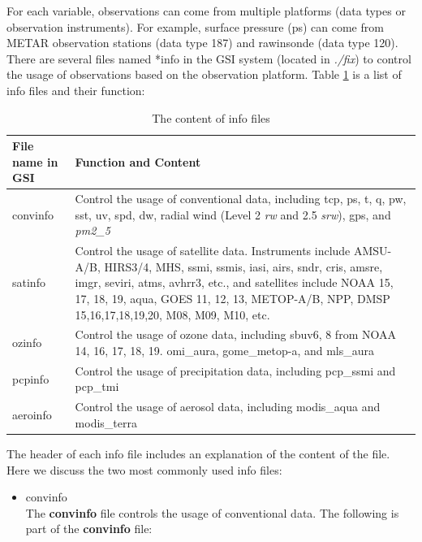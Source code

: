 \begin{enumerate}[leftmargin=*]
For each variable, observations can come from multiple platforms (data types or observation instruments). For example, surface pressure (ps) can come from METAR observation stations (data type 187) and rawinsonde (data type 120). There are several files named *info in the GSI system (located in \textit{./fix}) to control the usage of observations based on the observation platform. Table \ref{tab42} is a list of info files and their function:
\begin{table}[htbp]
\centering
\caption{The content of info files }
\begin{tabular}{|p{2cm}|p{14cm}|}
\hline
\hline
File name in GSI & Function and Content \\
\hline
convinfo & Control the usage of conventional data, including tcp, ps, t, q, pw, sst, uv, spd, dw, radial wind (Level 2 \textit{rw} and 2.5 \textit{srw}), gps, and \textit{pm2\_5} \\
\hline
satinfo	 & Control the usage of satellite data. Instruments include AMSU-A/B, HIRS3/4, MHS, ssmi, ssmis, iasi, airs, sndr, cris, amsre, imgr, seviri, atms, avhrr3, etc., and satellites include NOAA 15, 17, 18, 19, aqua, GOES 11, 12, 13, METOP-A/B, NPP, DMSP 15,16,17,18,19,20, 
M08, M09, M10, etc.\\
ozinfo & Control the usage of ozone data, including sbuv6, 8 from NOAA 14, 16, 17, 18, 19. omi\_aura, gome\_metop-a, and mls\_aura \\
\hline
pcpinfo	& Control the usage of precipitation data, including pcp\_ssmi and pcp\_tmi \\
\hline
aeroinfo & Control the usage of aerosol data, including modis\_aqua and modis\_terra \\
\hline
\end{tabular}
\label{tab42}
\end{table} 

The header of each info file includes an explanation of the content of the file. Here we discuss the two most commonly used info files:

\begin{itemize}[leftmargin=*]
\item convinfo\\

The \textbf{convinfo} file controls the usage of conventional data. The following is part of the \textbf{convinfo} file:

\begin{tiny}
\begin{verbatim}


\end{verbatim}
\end{tiny}
\end{itemize}
\end{enumerate}
